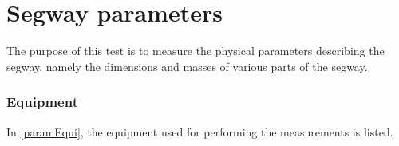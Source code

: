 \section{Segway parameters}
\label{app:segwayParameters}
The purpose of this test is to measure the physical parameters describing the segway, namely the dimensions and masses of various parts of the segway.

\subsubsection{Equipment}
In \autoref{paramEqui}, the equipment used for performing the measurements is listed.

\begin{table}[H]
\centering
{}
\caption{Equipment used for the test.}
\label{paramEqui}
\end{table}

